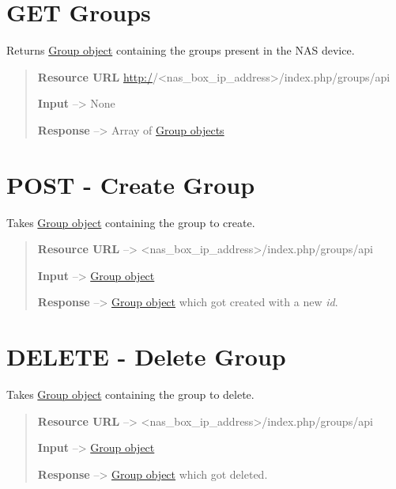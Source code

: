 \documentclass[letterpaper,10pt,english]{sphinxmanual}
\begin{document}
\section{GET Groups}
\label{usersgroups:get-groups}
Returns {\hyperref[usersgroups:group-object-label]{Group object}} containing the groups present
in the NAS device.
\begin{quote}

\textbf{Resource URL} \href{http:/}{http:/}/\textless{}nas\_box\_ip\_address\textgreater{}/index.php/groups/api

\textbf{Input} --\textgreater{} None

\textbf{Response} --\textgreater{} Array of {\hyperref[usersgroups:group-object-label]{Group objects}}
\end{quote}


\section{POST - Create Group}
\label{usersgroups:post-create-group}
Takes {\hyperref[usersgroups:group-object-label]{Group object}} containing the group to create.
\begin{quote}

\textbf{Resource URL} --\textgreater{} \textless{}nas\_box\_ip\_address\textgreater{}/index.php/groups/api

\textbf{Input} --\textgreater{} {\hyperref[usersgroups:group-object-label]{Group object}}

\textbf{Response} --\textgreater{} {\hyperref[usersgroups:group-object-label]{Group object}} which got created with a new \emph{id}.
\end{quote}


\section{DELETE - Delete Group}
\label{usersgroups:delete-delete-group}
Takes {\hyperref[usersgroups:group-object-label]{Group object}} containing the group to delete.
\begin{quote}

\textbf{Resource URL} --\textgreater{} \textless{}nas\_box\_ip\_address\textgreater{}/index.php/groups/api

\textbf{Input} --\textgreater{} {\hyperref[usersgroups:group-object-label]{Group object}}

\textbf{Response} --\textgreater{} {\hyperref[usersgroups:group-object-label]{Group object}} which got deleted.
\end{quote}
\end{document}
